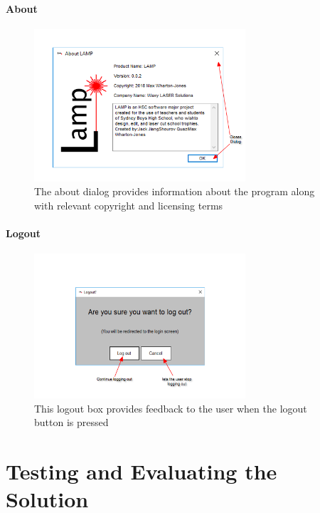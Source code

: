 \documentclass[oneside,openany,11pt,a4paper]{report}
\begin{document}
	\subsubsection{About}
\begin{figure}[H]
	\centering

	\includegraphics[width=0.7\textwidth]{screen/about.png}
	\caption{The about dialog provides information about the program along with relevant copyright and licensing terms}
\end{figure}

\subsubsection{Logout}
\begin{figure}[H]
	\centering
	
	\includegraphics[width=0.7\textwidth]{screen/logout.png}
	\caption{This logout box provides feedback to the user when the logout button is pressed}
\end{figure}





\chapter{Testing and Evaluating the Solution}
\end{document}
